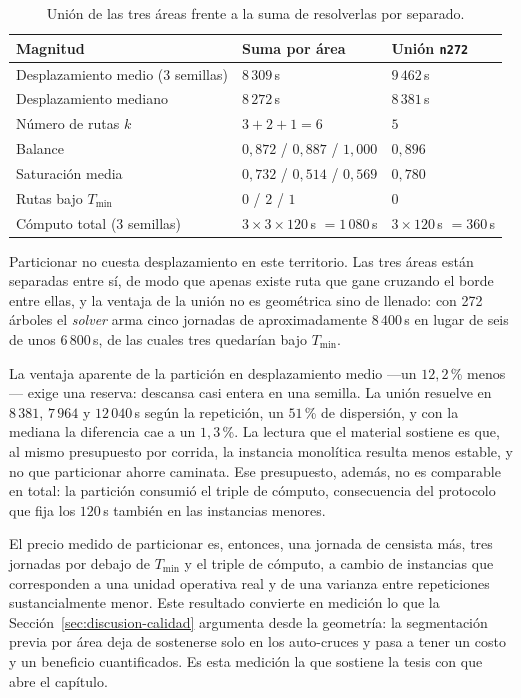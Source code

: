 \begin{enumerate}
\begin{table}[H]
  \centering
  \caption{Unión de las tres áreas frente a la suma de resolverlas por separado.}
  \label{tab:precio-particion}
  \begin{tabularx}{\textwidth}{lXX}
    \toprule
    Magnitud &
      Suma por área &
      Unión \texttt{n272} \\
    \midrule
    Desplazamiento medio (3 semillas) &
      $8\,309$\,s &
      $9\,462$\,s \\
    Desplazamiento mediano            &
      $8\,272$\,s &
      $8\,381$\,s \\
    Número de rutas $k$               &
      $3 + 2 + 1 = 6$ &
      $5$ \\
    Balance                           &
      $0{,}872$ / $0{,}887$ / $1{,}000$ &
      $0{,}896$ \\
    Saturación media                  &
      $0{,}732$ / $0{,}514$ / $0{,}569$ &
      $0{,}780$ \\
    Rutas bajo $T_{\min}$             &
      $0$ / $2$ / $1$ &
      $0$ \\
    Cómputo total (3 semillas)        &
      $3 \times 3 \times 120$\,s $= 1\,080$\,s &
      $3 \times 120$\,s $= 360$\,s \\
    \bottomrule
  \end{tabularx}
\end{table}

Particionar no cuesta desplazamiento en este territorio. Las tres áreas están separadas entre sí,
de modo que apenas existe ruta que gane cruzando el borde entre ellas, y la ventaja de la unión no es geométrica sino de llenado:
con 272 árboles el \textit{solver} arma cinco jornadas de aproximadamente $8\,400$\,s en lugar de
seis de unos $6\,800$\,s, de las cuales tres quedarían bajo $T_{\min}$.

La ventaja aparente de la partición en desplazamiento medio ---un $12{,}2$\,\% menos--- exige una
reserva: descansa casi entera en una semilla. La unión resuelve en $8\,381$, $7\,964$ y
$12\,040$\,s según la repetición, un $51$\,\% de dispersión, y con la mediana la diferencia cae a
un $1{,}3$\,\%. La lectura que el material sostiene es que, al mismo presupuesto por corrida, la
instancia monolítica resulta menos estable, y no que particionar ahorre caminata. Ese presupuesto,
además, no es comparable en total: la partición consumió el triple de cómputo, consecuencia del
protocolo que fija los $120$\,s también en las instancias menores.

El precio medido de particionar es, entonces, una jornada de censista más, tres jornadas por debajo
de $T_{\min}$ y el triple de cómputo, a cambio de instancias que corresponden a una unidad
operativa real y de una varianza entre repeticiones sustancialmente menor. Este resultado convierte
en medición lo que la Sección~\ref{sec:discusion-calidad} argumenta desde la geometría: la
segmentación previa por área deja de sostenerse solo en los auto-cruces y pasa a tener un costo y
un beneficio cuantificados. Es esta medición la que sostiene la tesis con que abre el capítulo.

\end{enumerate}

